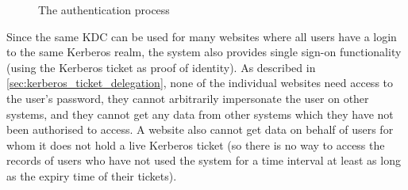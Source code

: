 \documentclass[12pt]{report}
\begin{document}
\begin{figure}[h]
  \begin{center}
  \end{center}
  \caption{The authentication process}
  \label{fig:authentication_process}
\end{figure}

Since the same KDC can be used for many websites where all users have a login to the same Kerberos realm, the system also provides single sign-on functionality (using the Kerberos ticket as proof of identity). As described in \autoref{sec:kerberos_ticket_delegation}, none of the individual websites need access to the user's password, they cannot arbitrarily impersonate the user on other systems, and they cannot get any data from other systems which they have not been authorised to access. A website also cannot get data on behalf of users for whom it does not hold a live Kerberos ticket (so there is no way to access the records of users who have not used the system for a time interval at least as long as the expiry time of their tickets).
\end{document}
